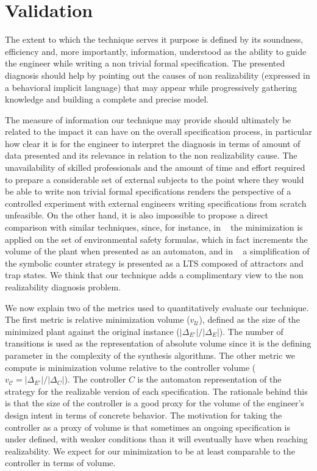 \newpage 
\section{Validation}
The extent to which the technique serves it purpose is defined by its soundness, efficiency and, more importantly, information, understood as the ability to guide the engineer while writing a non trivial formal specification. The presented diagnosis should help by pointing out the causes of non realizability (expressed in a behavioral implicit language) that may appear while progressively gathering knowledge and building a complete and precise model.

The measure of information our technique may provide should ultimately be related to the impact it can have on the overall specification process, in particular how clear it is for the engineer  to interpret the diagnosis in terms of amount of data presented and its relevance in relation to the non realizability cause. The unavailability of skilled professionals and the amount of time and effort required to prepare a considerable set of external subjects to the point where they would be able to write non trivial formal specifications renders the perspective of a controlled experiment with external engineers writing specifications from scratch unfeasible. On the other hand, it is also impossible to propose a direct comparison with similar techniques, since, for instance, in ~\cite{DBLP:conf/hvc/KonighoferHB10} the minimization is applied on the set of environmental safety formulas, which in fact increments the volume of the plant when presented as an automaton, and in ~\cite{DBLP:conf/sigsoft/KuventMR17} a simplification of the symbolic counter strategy is presented as a LTS composed of attractors and trap states. We think that our technique adds a complimentary view to the non realizability diagnosis problem.

We now explain two of the metrics used to quantitatively evaluate our technique. The first metric is relative minimization volume ($v_{\mathcal{U}}$), defined as the size of the minimized plant against the original instance ($|\Delta_{E'}|/|\Delta_{E}|$). The number of transitions is used as the representation of absolute volume since it is the defining parameter in the complexity of the synthesis algorithms. The other metric we compute is minimization volume relative to the controller volume ($v_{\mathcal{C}}=|\Delta_{E'}|/|\Delta_{C}|$). The controller $C$ is the automaton representation of the strategy for the realizable version of each specification. The rationale behind this is that the size of the controller is a good proxy for the volume of the engineer's design intent in terms of concrete behavior. The motivation for taking the controller as a proxy of volume is that sometimes an ongoing specification is under defined, with weaker conditions than it will eventually have when reaching realizability. We expect for our minimization to be at least comparable to the controller in terms of volume.


